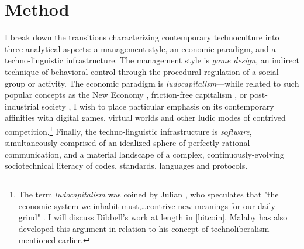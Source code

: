 \section*{Method}
I break down the transitions characterizing contemporary technoculture into three analytical aspects: a management style, an economic paradigm, and a techno-linguistic infrastructure. The management style is \emph{game design}, an indirect technique of behavioral control through the procedural regulation of a social group or activity. The economic paradigm is \emph{ludocapitalism}---while related to such popular concepts as the New Economy \autocite{Kelly1999-zr}, friction-free capitalism \autocite{Gates1995-lq}, or post-industrial society \autocite{Bell1973-pis}, I wish to place particular emphasis on its contemporary affinities with digital games, virtual worlds and other ludic modes of contrived competition.\footnote{
  The term \emph{ludocapitalism} was coined by Julian \citeauthor{Dibbell2007-dd}, who speculates that "the economic system we inhabit must,…contrive new meanings for our daily grind" \autocite[298]{Dibbell2007-dd}. I will discuss Dibbell's work at length in \cref{bitcoin}. Malaby has also developed this argument in relation to his concept of technoliberalism mentioned earlier.
} Finally, the techno-linguistic infrastructure is \emph{software}, simultaneously comprised of an idealized sphere of perfectly-rational communication, and a material landscape of a complex, continuously-evolving sociotechnical literacy of codes, standards, languages and protocols.

